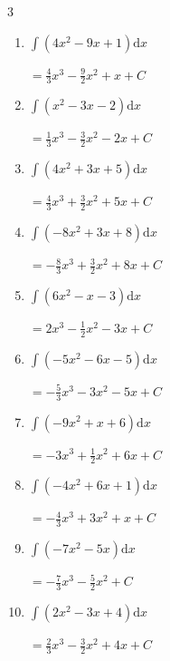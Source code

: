 \begin{multicols}{3}
\begin{enumerate}
        $\displaystyle =-2x^{3}-\frac{1}{2}x^{2}-5x+ C$

  \item $\displaystyle \int \left( 4x^{2}-9x+1 \right) \mathrm{d}x$

        $\displaystyle =\frac{4}{3}x^{3}-\frac{9}{2}x^{2}+x+ C$

  \item $\displaystyle \int \left( x^{2}-3x-2 \right) \mathrm{d}x$

        $\displaystyle =\frac{1}{3}x^{3}-\frac{3}{2}x^{2}-2x+ C$

  \item $\displaystyle \int \left( 4x^{2}+3x+5 \right) \mathrm{d}x$

        $\displaystyle =\frac{4}{3}x^{3}+\frac{3}{2}x^{2}+5x+ C$

  \item $\displaystyle \int \left( -8x^{2}+3x+8 \right) \mathrm{d}x$

        $\displaystyle =-\frac{8}{3}x^{3}+\frac{3}{2}x^{2}+8x+ C$

  \item $\displaystyle \int \left( 6x^{2}-x-3 \right) \mathrm{d}x$

        $\displaystyle =2x^{3}-\frac{1}{2}x^{2}-3x+ C$

\columnbreak %

  \item $\displaystyle \int \left( -5x^{2}-6x-5 \right) \mathrm{d}x$

        $\displaystyle =-\frac{5}{3}x^{3}-3x^{2}-5x+ C$

  \item $\displaystyle \int \left( -9x^{2}+x+6 \right) \mathrm{d}x$

        $\displaystyle =-3x^{3}+\frac{1}{2}x^{2}+6x+ C$

  \item $\displaystyle \int \left( -4x^{2}+6x+1 \right) \mathrm{d}x$

        $\displaystyle =-\frac{4}{3}x^{3}+3x^{2}+x+ C$

  \item $\displaystyle \int \left( -7x^{2}-5x \right) \mathrm{d}x$

        $\displaystyle =-\frac{7}{3}x^{3}-\frac{5}{2}x^{2}+ C$

  \item $\displaystyle \int \left( 2x^{2}-3x+4 \right) \mathrm{d}x$

        $\displaystyle =\frac{2}{3}x^{3}-\frac{3}{2}x^{2}+4x+ C$


\end{enumerate}
\end{multicols}
